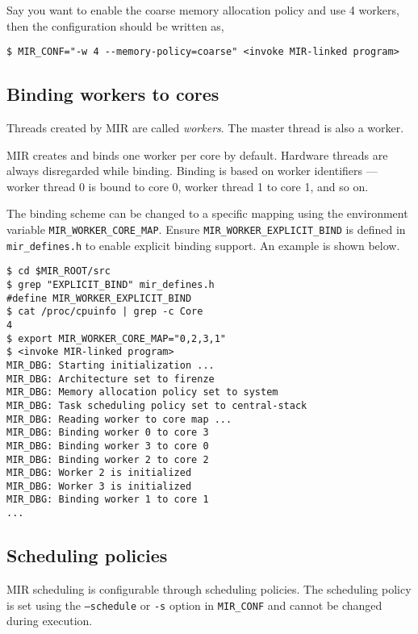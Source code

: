 \documentclass[11pt,a4paper]{article}
\begin{document}
Say you want to enable the coarse memory allocation policy and use 4 workers, then the configuration should be written as,

\begin{lstlisting}[style=MyInputStyle]
$ MIR_CONF="-w 4 --memory-policy=coarse" <invoke MIR-linked program>
\end{lstlisting}

\subsection{Binding workers to cores}\label{sec:binding-workers-to-cores}
Threads created by MIR are called \textit{workers}. The master thread is also a worker.

MIR creates and binds one worker per core by default. Hardware threads are always disregarded while binding. Binding is based on worker identifiers --- worker thread 0 is bound to core 0, worker thread 1 to core 1, and so on.

The binding scheme can be changed to a specific mapping using the environment variable \texttt{MIR\_WORKER\_CORE\_MAP}. Ensure \texttt{MIR\_WORKER\_EXPLICIT\_BIND} is defined in \texttt{mir\_defines.h} to enable explicit binding support. An example is shown below.

\begin{lstlisting}[style=MyInputStyle]
$ cd $MIR_ROOT/src
$ grep "EXPLICIT_BIND" mir_defines.h
#define MIR_WORKER_EXPLICIT_BIND
$ cat /proc/cpuinfo | grep -c Core
4
$ export MIR_WORKER_CORE_MAP="0,2,3,1"
$ <invoke MIR-linked program>
MIR_DBG: Starting initialization ...
MIR_DBG: Architecture set to firenze
MIR_DBG: Memory allocation policy set to system
MIR_DBG: Task scheduling policy set to central-stack
MIR_DBG: Reading worker to core map ...
MIR_DBG: Binding worker 0 to core 3
MIR_DBG: Binding worker 3 to core 0
MIR_DBG: Binding worker 2 to core 2
MIR_DBG: Worker 2 is initialized
MIR_DBG: Worker 3 is initialized
MIR_DBG: Binding worker 1 to core 1
...
\end{lstlisting}

\subsection{Scheduling policies}\label{sec:scheduling-policies}

MIR scheduling is configurable through scheduling policies. The scheduling policy is set using the \texttt{--schedule} or \texttt{-s} option in \texttt{MIR\_CONF} and cannot be changed during execution.
\end{document}
